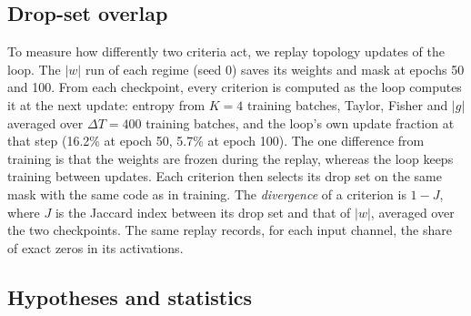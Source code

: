 \subsection{Drop-set overlap}
\label{sec:overlap}

To measure how differently two criteria act, we replay topology updates of the loop. The $|w|$ run of each regime (seed 0) saves its weights and mask at epochs 50 and 100. From each checkpoint, every criterion is computed as the loop computes it at the next update: entropy from $K=4$ training batches, Taylor, Fisher and $|g|$ averaged over $\Delta T=400$ training batches, and the loop's own update fraction at that step (16.2\% at epoch 50, 5.7\% at epoch 100). The one difference from training is that the weights are frozen during the replay, whereas the loop keeps training between updates. Each criterion then selects its drop set on the same mask with the same code as in training. The \emph{divergence} of a criterion is $1-J$, where $J$ is the Jaccard index between its drop set and that of $|w|$, averaged over the two checkpoints. The same replay records, for each input channel, the share of exact zeros in its activations.

\subsection{Hypotheses and statistics}
\label{sec:stats}

